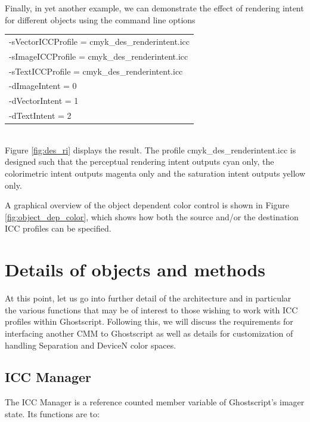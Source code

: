 \documentclass[12pt,notitlepage]{article}
\begin{document}
Finally, in yet another example, we can demonstrate the effect of rendering intent for different objects using the command line options\\

\begin{tabular}{l}
-sVectorICCProfile = cmyk\_des\_renderintent.icc\\
-sImageICCProfile = cmyk\_des\_renderintent.icc\\
 -sTextICCProfile = cmyk\_des\_renderintent.icc\\
-dImageIntent = 0\\
-dVectorIntent = 1\\
-dTextIntent = 2\\
\end{tabular}\\

Figure \ref{fig:des_ri} displays the result.  The profile cmyk\_des\_renderintent.icc is designed such that the perceptual rendering intent outputs cyan only, the colorimetric intent outputs magenta only and the saturation intent outputs yellow only.

A graphical overview of the object dependent color control is shown in Figure \ref{fig:object_dep_color}, which shows how both the source and/or the destination ICC profiles can be specified.\\

\section{Details of objects and methods}

At this point, let us go into further detail of the architecture and in particular the various functions that may be of interest to those wishing to work with ICC profiles within Ghostscript.  Following this, we will discuss the requirements for interfacing another CMM to Ghostscript as well as details for customization of handling Separation and DeviceN color spaces.

\subsection{ICC Manager}

The ICC Manager is a reference counted member variable of Ghostscript's imager state.  Its functions are to:
\end{document}
